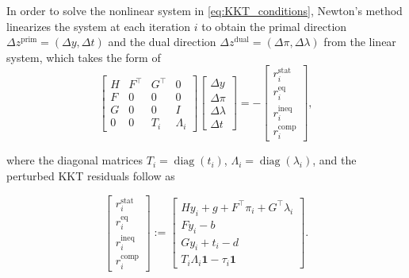 \documentclass[class=scrbook, crop=false]{standalone}
\begin{document}
In order to solve the nonlinear system in \eqref{eq:KKT_conditions},
Newton's method linearizes the system at each iteration $i$
to obtain the primal direction $\Delta z^{\mathrm{prim}} = (\Delta y, \Delta t)$ and the dual direction $\Delta z^{\mathrm{dual}} = (\Delta \pi, \Delta \lambda)$ from the linear system, which takes the form of
\begin{equation}
    \begin{bmatrix}
    H & F^\top & G^\top & 0\\
    F & 0 & 0 & 0 \\
    G & 0 & 0 & I \\
    0 & 0 & T_i & \Lambda_i
    \end{bmatrix}
    \begin{bmatrix}
    \Delta y \\
    \Delta \pi \\
    \Delta \lambda \\
    \Delta t
    \end{bmatrix} = -
    \begin{bmatrix}
    r_i^{\mathrm{stat}} \\
    r_i^{\mathrm{eq}} \\
    r_i^{\mathrm{ineq}} \\
    r_i^{\mathrm{comp}}
    \end{bmatrix},
    \label{eq:IPM_KKT_system}
\end{equation}

where the diagonal matrices $T_i=\operatorname{diag}(t_i)$, $\Lambda_i=\operatorname{diag}(\lambda_i)$,
and the perturbed \gls{KKT} residuals follow as

\begin{equation}
    \begin{bmatrix}
        r_i^{\mathrm{stat}} \\ r_i^{\mathrm{eq}} \\
        r_i^{\mathrm{ineq}} \\ r_i^{\mathrm{comp}}
    \end{bmatrix}
    :=
    \begin{bmatrix}
        Hy_i + g + F^\top \pi_i + G^\top \lambda_i \\
        Fy_i - b \\
        Gy_i + t_i - d \\
        T_i \Lambda_i \mathbf{1} - \tau_i \mathbf{1}
    \end{bmatrix}.
    \label{eq:residuals}
\end{equation}
\end{document}
